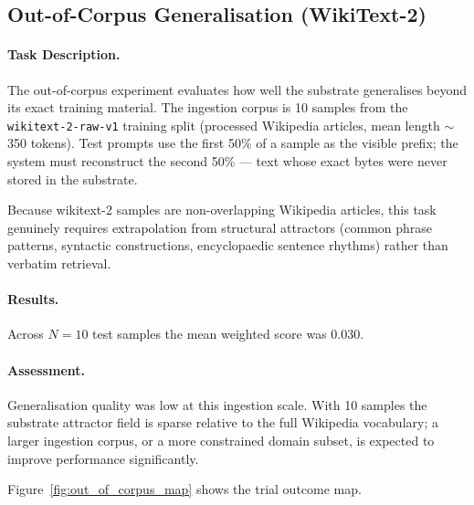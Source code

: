 \subsection{Out-of-Corpus Generalisation (WikiText-2)}
\label{sec:out_of_corpus}

\paragraph{Task Description.}
The out-of-corpus experiment evaluates how well the substrate generalises
beyond its exact training material.  The ingestion corpus is 10 samples
from the \texttt{wikitext-2-raw-v1} training split (processed Wikipedia
articles, mean length $\sim$350 tokens).  Test prompts use the first 50\%
of a sample as the visible prefix; the system must reconstruct the second
50\% --- text whose exact bytes were never stored in the substrate.

Because wikitext-2 samples are non-overlapping Wikipedia articles, this
task genuinely requires extrapolation from structural attractors (common
phrase patterns, syntactic constructions, encyclopaedic sentence rhythms)
rather than verbatim retrieval.

\paragraph{Results.}
Across $N = 10$ test samples the mean weighted score was 0.030.

\paragraph{Assessment.}
Generalisation quality was low at this ingestion scale.  With 10 samples
the substrate attractor field is sparse relative to the full Wikipedia
vocabulary; a larger ingestion corpus, or a more constrained domain subset,
is expected to improve performance significantly.

Figure~\ref{fig:out_of_corpus_map} shows the trial outcome map.
